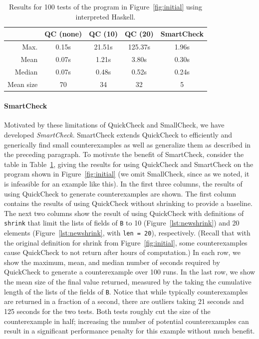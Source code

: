 \documentclass[10pt]{sigplanconf}
\newcommand{\ttp}[1]{\texttt{#1}}
\begin{document}
\begin{table}[ht]
\footnotesize
  \begin{center}
    \begin{tabular}{|r||c|c|c|c|}
\hline
 & QC (none) & QC (10) & QC (20) & SmartCheck \\
\hline \hline
Max.  & 0.15s & 21.51s & 125.37s & 1.96s\\
\hline
Mean  & 0.07s & 1.21s & 3.80s & 0.30s\\
\hline
Median & 0.07s & 0.48s & 0.52s & 0.24s\\
\hline
Mean size & 70 & 34 & 32 & 5\\
\hline
    \end{tabular}
  \end{center}
  \caption{Results for 100 tests of the program in Figure~\ref{fig:initial}
    using interpreted Haskell.}
  \label{table:results}
\end{table}


\paragraph{SmartCheck}
Motivated by these limitations of QuickCheck and SmallCheck, we have developed
\emph{SmartCheck}.  SmartCheck extends QuickCheck to efficiently and generically
find small counterexamples as well as generalize them as described in the
preceding paragraph.  To motivate the benefit of SmartCheck, consider the table
in Table~\ref{table:results}, giving the results for using QuickCheck and
SmartCheck on the program shown in Figure~\ref{fig:initial} (we omit SmallCheck,
since as we noted, it is infeasible for an example like this).  In the first
three columns, the results of using QuickCheck to generate counterexamples are
shown.  The first column contains the results of using QuickCheck without
shrinking to provide a baseline.  The next two columns show the result of using
QuickCheck with definitions of \ttp{shrink} that limit the lists of fields of
\ttp{B} to 10 (Figure~\ref{lst:newshrink}) and 20 elements
(Figure~\ref{lst:newshrink}, with \ttp{len = 20}), respectively.  (Recall that
with the original definition for shrink from Figure~\ref{fig:initial}, some
counterexamples cause QuickCheck to not return after hours of computation.)  In
each row, we show the maximum, mean, and median number of seconds required by
QuickCheck to generate a counterexample over 100 runs.  In the last row, we show
the mean size of the final value returned, measured by the taking the cumulative
length of the lists of the fields of \ttp{B}.  Notice that while typically
counterexamples are returned in a fraction of a second, there are outliers
taking 21 seconds and 125 seconds for the two tests.  Both tests roughly cut the
size of the counterexample in half; increasing the number of potential
counterexamples can result in a significant performance penalty for this example
without much benefit.
\end{document}

